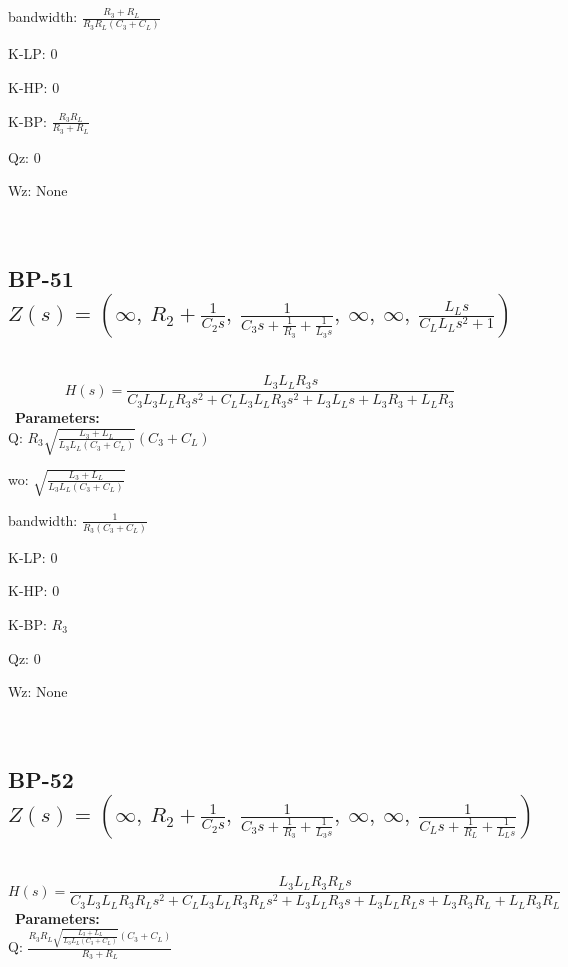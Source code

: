 \documentclass{article}
\begin{document}
bandwidth: $\frac{R_{3} + R_{L}}{R_{3} R_{L} \left(C_{3} + C_{L}\right)}$\ 

K-LP: $0$\ 

K-HP: $0$\ 

K-BP: $\frac{R_{3} R_{L}}{R_{3} + R_{L}}$\ 

Qz: $0$\ 

Wz: $\text{None}$\ 

\ 

\subsection{BP-51 $Z(s) = \left( \infty, \  R_{2} + \frac{1}{C_{2} s}, \  \frac{1}{C_{3} s + \frac{1}{R_{3}} + \frac{1}{L_{3} s}}, \  \infty, \  \infty, \  \frac{L_{L} s}{C_{L} L_{L} s^{2} + 1}\right)$ } \ 
\textbf{\[H(s) = \frac{L_{3} L_{L} R_{3} s}{C_{3} L_{3} L_{L} R_{3} s^{2} + C_{L} L_{3} L_{L} R_{3} s^{2} + L_{3} L_{L} s + L_{3} R_{3} + L_{L} R_{3}}\] } \ 
\textbf{Parameters:}\\ 

Q: $R_{3} \sqrt{\frac{L_{3} + L_{L}}{L_{3} L_{L} \left(C_{3} + C_{L}\right)}} \left(C_{3} + C_{L}\right)$\ 

wo: $\sqrt{\frac{L_{3} + L_{L}}{L_{3} L_{L} \left(C_{3} + C_{L}\right)}}$\ 

bandwidth: $\frac{1}{R_{3} \left(C_{3} + C_{L}\right)}$\ 

K-LP: $0$\ 

K-HP: $0$\ 

K-BP: $R_{3}$\ 

Qz: $0$\ 

Wz: $\text{None}$\ 

\ 

\subsection{BP-52 $Z(s) = \left( \infty, \  R_{2} + \frac{1}{C_{2} s}, \  \frac{1}{C_{3} s + \frac{1}{R_{3}} + \frac{1}{L_{3} s}}, \  \infty, \  \infty, \  \frac{1}{C_{L} s + \frac{1}{R_{L}} + \frac{1}{L_{L} s}}\right)$ } \ 
\textbf{\[H(s) = \frac{L_{3} L_{L} R_{3} R_{L} s}{C_{3} L_{3} L_{L} R_{3} R_{L} s^{2} + C_{L} L_{3} L_{L} R_{3} R_{L} s^{2} + L_{3} L_{L} R_{3} s + L_{3} L_{L} R_{L} s + L_{3} R_{3} R_{L} + L_{L} R_{3} R_{L}}\] } \ 
\textbf{Parameters:}\\ 

Q: $\frac{R_{3} R_{L} \sqrt{\frac{L_{3} + L_{L}}{L_{3} L_{L} \left(C_{3} + C_{L}\right)}} \left(C_{3} + C_{L}\right)}{R_{3} + R_{L}}$\ 
\end{document}
